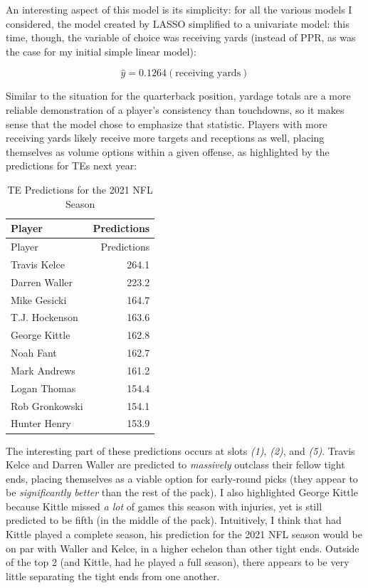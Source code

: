 \documentclass[
]{article}
\begin{document}
An interesting aspect of this model is its simplicity: for all the
various models I considered, the model created by LASSO simplified to a
univariate model: this time, though, the variable of choice was
receiving yards (instead of PPR, as was the case for my initial simple
linear model):

\[
\hat{y}= 0.1264(\text{receiving yards})
\]

Similar to the situation for the quarterback position, yardage totals
are a more reliable demonstration of a player's consistency than
touchdowns, so it makes sense that the model chose to emphasize that
statistic. Players with more receiving yards likely receive more targets
and receptions as well, placing themselves as volume options within a
given offense, as highlighted by the predictions for TEs next year:

\begin{longtable}[]{@{}lr@{}}
\caption{TE Predictions for the 2021 NFL Season}\tabularnewline
\toprule
Player & Predictions \\
\midrule
\endfirsthead
\toprule
Player & Predictions \\
\midrule
\endhead
Travis Kelce & 264.1 \\
Darren Waller & 223.2 \\
Mike Gesicki & 164.7 \\
T.J. Hockenson & 163.6 \\
George Kittle & 162.8 \\
Noah Fant & 162.7 \\
Mark Andrews & 161.2 \\
Logan Thomas & 154.4 \\
Rob Gronkowski & 154.1 \\
Hunter Henry & 153.9 \\
\bottomrule
\end{longtable}

The interesting part of these predictions occurs at slots \emph{(1)},
\emph{(2)}, and \emph{(5)}. Travis Kelce and Darren Waller are predicted
to \emph{massively} outclass their fellow tight ends, placing themselves
as a viable option for early-round picks (they appear to be
\emph{significantly better} than the rest of the pack). I also
highlighted George Kittle because Kittle missed \emph{a lot} of games
this season with injuries, yet is still predicted to be fifth (in the
middle of the pack). Intuitively, I think that had Kittle played a
complete season, his prediction for the 2021 NFL season would be on par
with Waller and Kelce, in a higher echelon than other tight ends.
Outside of the top 2 (and Kittle, had he played a full season), there
appears to be very little separating the tight ends from one another.
\end{document}
